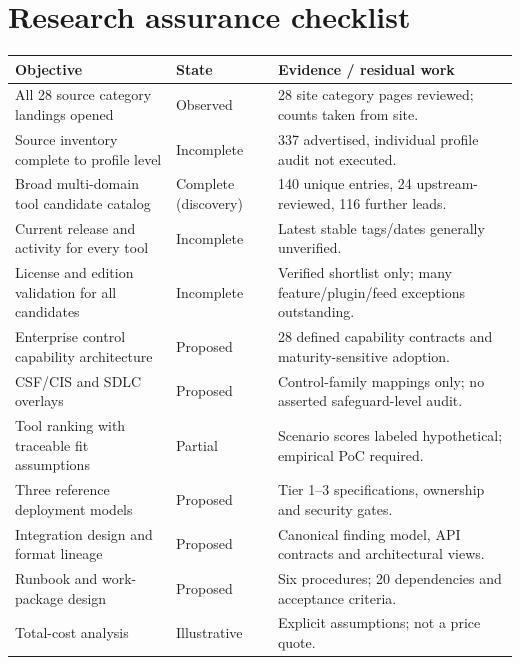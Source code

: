 \documentclass[11pt,oneside]{report}
\begin{document}
\section{Research assurance checklist}

\noindent\begin{tabularx}{\textwidth}{P{0.39\textwidth}P{0.14\textwidth}Y}
\toprule Objective & State & Evidence / residual work\\\midrule
All 28 source category landings opened & Observed & 28 site category pages reviewed; counts taken from site.\\
Source inventory complete to profile level & Incomplete & 337 advertised, individual profile audit not executed.\\
Broad multi-domain tool candidate catalog & Complete (discovery) & 140 unique entries, 24 upstream-reviewed, 116 further leads.\\
Current release and activity for every tool & Incomplete & Latest stable tags/dates generally unverified.\\
License and edition validation for all candidates & Incomplete & Verified shortlist only; many feature/plugin/feed exceptions outstanding.\\
Enterprise control capability architecture & Proposed & 28 defined capability contracts and maturity-sensitive adoption.\\
CSF/CIS and SDLC overlays & Proposed & Control-family mappings only; no asserted safeguard-level audit.\\
Tool ranking with traceable fit assumptions & Partial & Scenario scores labeled hypothetical; empirical PoC required.\\
Three reference deployment models & Proposed & Tier 1--3 specifications, ownership and security gates.\\
Integration design and format lineage & Proposed & Canonical finding model, API contracts and architectural views.\\
Runbook and work-package design & Proposed & Six procedures; 20 dependencies and acceptance criteria.\\
Total-cost analysis & Illustrative & Explicit assumptions; not a price quote.\\
\bottomrule
\end{tabularx}
\end{document}
